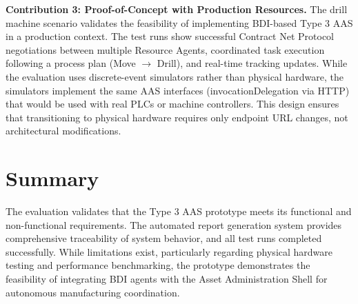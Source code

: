 \textbf{Contribution 3: Proof-of-Concept with Production Resources.} The drill machine scenario validates the feasibility of implementing BDI-based Type 3 \ac{AAS} in a production context. The test runs show successful Contract Net Protocol negotiations between multiple Resource Agents, coordinated task execution following a process plan (Move $\rightarrow$ Drill), and real-time tracking updates. While the evaluation uses discrete-event simulators rather than physical hardware, the simulators implement the same \ac{AAS} interfaces (invocationDelegation via HTTP) that would be used with real PLCs or machine controllers. This design ensures that transitioning to physical hardware requires only endpoint URL changes, not architectural modifications.

\section{Summary}

The evaluation validates that the Type 3 \ac{AAS} prototype meets its functional and non-functional requirements. The automated report generation system provides comprehensive traceability of system behavior, and all test runs completed successfully. While limitations exist, particularly regarding physical hardware testing and performance benchmarking, the prototype demonstrates the feasibility of integrating BDI agents with the Asset Administration Shell for autonomous manufacturing coordination.
